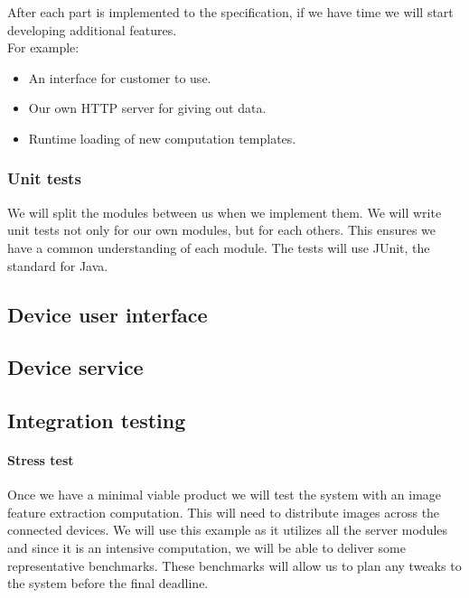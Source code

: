 \documentclass[
  twoside,
  10pt, a4paper
]{article}
\begin{document}
After each part is implemented to the specification, if we have time we will start developing additional features.\\
For example:
\begin{itemize}
\item An interface for customer to use.
\item Our own HTTP server for giving out data.
\item Runtime loading of new computation templates.
\end{itemize}

\subsubsection{Unit tests}

We will split the modules between us when we implement them. We will write unit tests not only for our own modules, but for each others.
This ensures we have a common understanding of each module. The tests will use JUnit, the standard for Java.







\subsection{Device user interface}

\subsection{Device service}

\subsection{Integration testing}
\paragraph{Stress test}

Once we have a minimal viable product we will test the system with an image feature extraction computation. This will need to distribute images across the connected devices.
We will use this example as it utilizes all the server modules and since it is an intensive computation, we will be able to deliver some representative benchmarks.
These benchmarks will allow us to plan any tweaks to the system before the final deadline.
\end{document}
